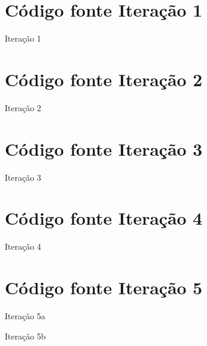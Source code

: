 \section{Código fonte Iteração 1
\label{source:iteracao-1}}\label{cuxf3digo-fonte-iterauxe7uxe3o-1}

\begin{listing}[H]
    \caption{Iteração 1}
    \label{code:semaforo-1}
\end{listing}

\section{Código fonte Iteração 2
\label{source:iteracao-2}}\label{cuxf3digo-fonte-iterauxe7uxe3o-2}

\begin{listing}[H]
    \caption{Iteração 2}
    \label{code:semaforo-2}
\end{listing}

\section{Código fonte Iteração 3
\label{source:iteracao-3}}\label{cuxf3digo-fonte-iterauxe7uxe3o-3}

\begin{listing}[H]
    \caption{Iteração 3}
    \label{code:display-7seg-1}
\end{listing}

\section{Código fonte Iteração 4
\label{source:iteracao-4}}\label{cuxf3digo-fonte-iterauxe7uxe3o-4}

\begin{listing}[H]
    \caption{Iteração 4}
    \label{code:display-7seg-2}
\end{listing}

\section{Código fonte Iteração 5
\label{source:iteracao-5}}\label{cuxf3digo-fonte-iterauxe7uxe3o-5}

\begin{listing}[H]
    \caption{Iteração 5a}
    \label{code:display-7seg-3a}
\end{listing}

\begin{listing}[H]
    \caption{Iteração 5b}
    \label{code:display-7seg-3a}
\end{listing}
